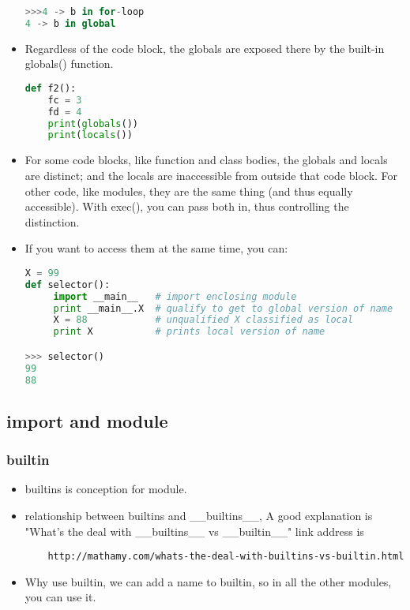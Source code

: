 \documentclass[a4paper,12pt,twoside]{book}
\begin{document}
\begin{itemize}
\begin{lstlisting}[frame=single, language=Python]
>>>4 -> b in for-loop
4 -> b in global
\end{lstlisting}  

	\item Regardless of the code block, the globals are exposed there by the built-in globals() function. 
\begin{lstlisting}[frame=single, language=Python]
	def f2():
	fc = 3
	fd = 4
	print(globals())
	print(locals())
\end{lstlisting}  
	
	\item For some code blocks, like function and class bodies, the globals and locals are distinct; and the locals are inaccessible from outside that code block. For other code, like modules, they are the same thing (and thus equally accessible). With exec(), you can pass both in, thus controlling the distinction.

	\item If you want to access them at the same time, you can:
\begin{lstlisting}[frame=single, language=python]
X = 99
def selector():
     import __main__   # import enclosing module
     print __main__.X  # qualify to get to global version of name
     X = 88            # unqualified X classified as local
     print X           # prints local version of name

>>> selector()
99
88
	\end{lstlisting} 
\end{itemize}

\subsection{import and module}
\subsubsection{builtin}
\begin{itemize}
	\item builtins is conception for module.
	\item relationship between builtins and \_\_builtins\_\_, A good explanation is "What's the deal with \_\_builtins\_\_ vs \_\_builtin\_\_" link address is \begin{verbatim}
	http://mathamy.com/whats-the-deal-with-builtins-vs-builtin.html \end{verbatim}
	\item Why use builtin, we can add a name to builtin,  so in all the other modules, you can use it.
\end{itemize}
\end{document}
